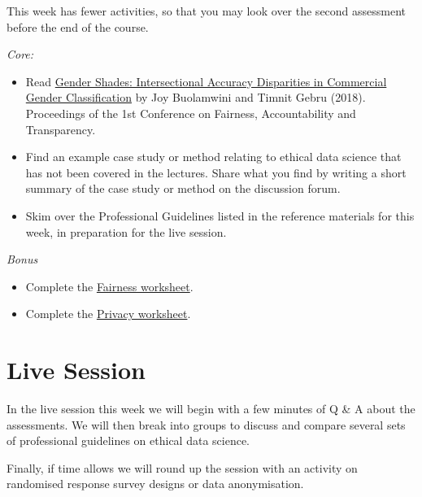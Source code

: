 \documentclass[
  letterpaper,
  DIV=11,
  numbers=noendperiod]{scrreprt}
\begin{document}

This week has fewer activities, so that you may look over the second
assessment before the end of the course.

\emph{Core:}

\begin{itemize}
\item
  Read
  \href{https://proceedings.mlr.press/v81/buolamwini18a.html}{Gender
  Shades: Intersectional Accuracy Disparities in Commercial Gender
  Classification} by Joy Buolamwini and Timnit Gebru (2018). Proceedings
  of the 1st Conference on Fairness, Accountability and Transparency.
\item
  Find an example case study or method relating to ethical data science
  that has not been covered in the lectures. Share what you find by
  writing a short summary of the case study or method on the discussion
  forum.
\item
  Skim over the Professional Guidelines listed in the reference
  materials for this week, in preparation for the live session.
\end{itemize}

\emph{Bonus}

\begin{itemize}
\item
  Complete the
  \href{https://zakvarty.github.io/effective-data-science-resources/activities/fairness-worksheet/fairness-worksheet-questions.html}{Fairness
  worksheet}.
\item
  Complete the
  \href{https://zakvarty.github.io/effective-data-science-resources/activities/privacy-worksheet/privacy-worksheet-questions.html}{Privacy
  worksheet}.
\end{itemize}

\section*{Live Session}\label{live-session-4}


In the live session this week we will begin with a few minutes of Q \& A
about the assessments. We will then break into groups to discuss and
compare several sets of professional guidelines on ethical data science.

Finally, if time allows we will round up the session with an activity on
randomised response survey designs or data anonymisation.
\end{document}

